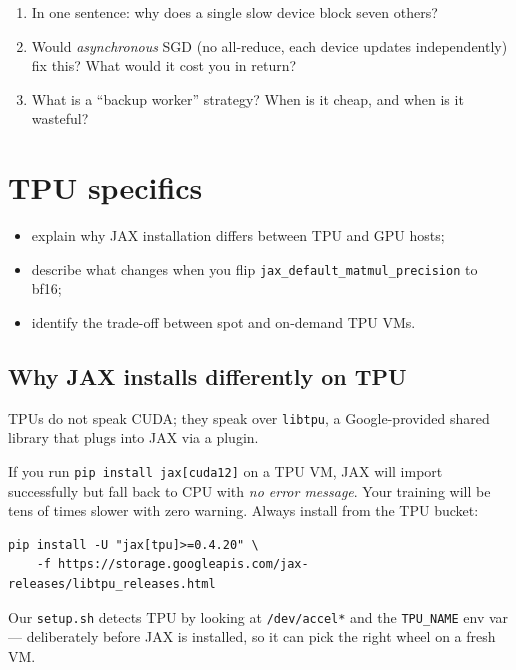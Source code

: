 \documentclass[11pt,a4paper]{article}
\newcommand{\answerspace}[1][3]{\vspace{#1\baselineskip}}
\begin{document}
\begin{checkpoint}
\begin{enumerate}[leftmargin=*]
\item In one sentence: why does a single slow device block seven others?
\item Would \emph{asynchronous} SGD (no all-reduce, each device updates independently) fix
      this? What would it cost you in return?
\item What is a ``backup worker'' strategy? When is it cheap, and when is it wasteful?
\end{enumerate}
\answerspace[5]
\end{checkpoint}

\section{TPU specifics}

\begin{objectives}
\begin{itemize}[leftmargin=*, itemsep=1pt]
    \item explain why JAX installation differs between TPU and GPU hosts;
    \item describe what changes when you flip \texttt{jax\_default\_matmul\_precision} to bf16;
    \item identify the trade-off between spot and on-demand TPU VMs.
\end{itemize}
\end{objectives}

\subsection{Why JAX installs differently on TPU}

TPUs do not speak CUDA; they speak over \texttt{libtpu}, a Google-provided shared library
that plugs into JAX via a plugin.

\begin{pitfall}
If you run \texttt{pip install jax[cuda12]} on a TPU VM, JAX will import successfully but
fall back to CPU with \emph{no error message}. Your training will be tens of times slower
with zero warning. Always install from the TPU bucket:
\begin{lstlisting}[style=sh]
pip install -U "jax[tpu]>=0.4.20" \
    -f https://storage.googleapis.com/jax-releases/libtpu_releases.html
\end{lstlisting}
Our \texttt{setup.sh} detects TPU by looking at \texttt{/dev/accel*} and the \texttt{TPU\_NAME}
env var --- deliberately before JAX is installed, so it can pick the right wheel on a fresh VM.
\end{pitfall}
\end{document}
